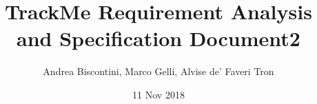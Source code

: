 
\usepackage[english]{babel}
\usepackage{natbib}
\usepackage{url}

\usepackage[section]{placeins}
\usepackage[dvipsnames]{xcolor}
\usepackage{listings}
\usepackage{alloy-style}

\usepackage{graphicx}
\usepackage{subcaption}


\title{TrackMe Requirement Analysis and Specification Document}								%
\author{Andrea Biscontini, Marco Gelli, Alvise de' Faveri Tron}								%
\date{11 Nov 2018}											%

\makeatletter
\let\thetitle\@title
\let\theauthor\@author
\let\thedate\@date
\makeatother

\pagestyle{fancy}
\fancyhf{}
\cfoot{\thepage}



\title{2} 


